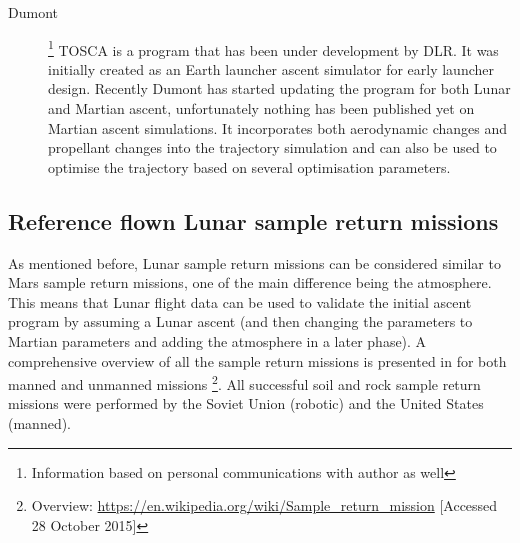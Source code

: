 \begin{description}
\item[Dumont \cite{dumont2015design}]\footnote{Information based on personal communications with author as well} \ac{TOSCA} is a program that has been under development by \ac{DLR}. It was initially created as an Earth launcher ascent simulator for early launcher design. Recently Dumont has started updating the program for both Lunar and Martian ascent, unfortunately nothing has been published yet on Martian ascent simulations. It incorporates both aerodynamic changes and propellant changes into the trajectory simulation and can also be used to optimise the trajectory based on several optimisation parameters. 
\end{description}
%


\subsection{Reference flown Lunar sample return missions}
\label{subsec:lunarsrm}
As mentioned before, Lunar sample return missions can be considered similar to Mars sample return missions, one of the main difference being the atmosphere. This means that Lunar flight data can be used to validate the initial ascent program by assuming a Lunar ascent (and then changing the parameters to Martian parameters and adding the atmosphere in a later phase). A comprehensive overview of all the sample return missions is presented in  for both manned and unmanned missions \footnote{Overview: \url{https://en.wikipedia.org/wiki/Sample_return_mission} [Accessed 28 October 2015]}. All successful soil and rock sample return missions were performed by the Soviet Union (robotic) and the United States (manned). 

